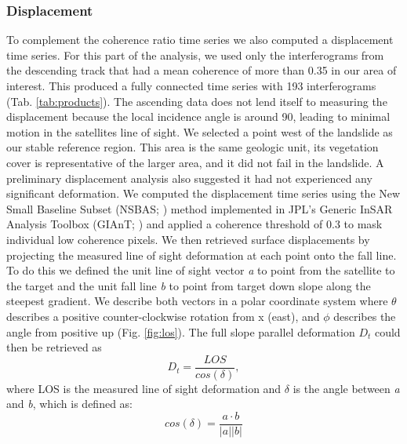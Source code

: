 \documentclass[nhess, manuscript]{copernicus}
\begin{document}
\subsubsection{Displacement}
\label{sec:disp}
To complement the coherence ratio time series we also computed a displacement time series. For this part of the analysis, we used only the interferograms from the descending track that had a mean coherence of more than 0.35 in our area of interest. This produced a fully connected time series with 193 interferograms (Tab. \ref{tab:products}). The ascending data does not lend itself to measuring the displacement because the local incidence angle is around 90\textdegree, leading to minimal motion in the satellites line of sight. We selected a point west of the landslide as our stable reference region. This area is the same geologic unit, its vegetation cover is representative of the larger area, and it did not fail in the landslide. A preliminary displacement analysis also suggested it had not experienced any significant deformation. We computed the displacement time series using the New Small Baseline Subset (NSBAS; \cite{berardino2002}) method implemented in JPL's Generic InSAR Analysis Toolbox (GIAnT; \cite{agram2013}) and applied a coherence threshold of 0.3 to mask individual low coherence pixels. We then retrieved surface displacements by projecting the measured line of sight deformation at each point onto the fall line. To do this we defined the unit line of sight vector \textit{a} to point from the satellite to the target and the unit fall line \textit{b} to point from target down slope along the steepest gradient. We describe both vectors in a polar coordinate system where $\theta$ describes a positive counter-clockwise rotation from x (east), and $\phi$ describes the angle from positive up (Fig. \ref{fig:los}). The full slope parallel deformation $D_t$ could then be retrieved as
\begin{equation}
    D_t = \frac{LOS}{cos(\delta)}, 
    \label{eq:los1}
\end{equation}
where LOS is the measured line of sight deformation and $\delta$ is the angle between \textit{a} and \textit{b}, which is defined as:
\begin{equation}
    cos(\delta) = \frac{a \cdot b}{\rvert a \rvert \rvert b \rvert}
    \label{eq:los2}
\end{equation}
  
\end{document}
